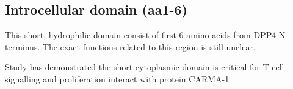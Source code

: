 \subsection{Introcellular domain (aa1-6)}

This short, hydrophilic domain consist of first 6 amino acids from DPP4 N-terminus. The exact functions related to this region is still unclear.

Study has demonstrated the short cytoplasmic domain is critical for T-cell signalling and proliferation interact with protein CARMA-1 
